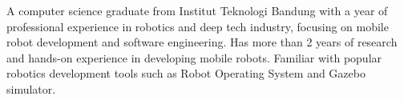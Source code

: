 

\begin{cvparagraph}
A computer science graduate from Institut Teknologi Bandung with a year of professional experience in robotics and deep tech industry, focusing on mobile robot development and software engineering. Has more than 2 years of research and hands-on experience in developing mobile robots. Familiar with popular robotics development tools such as Robot Operating System and Gazebo simulator.


\end{cvparagraph}
